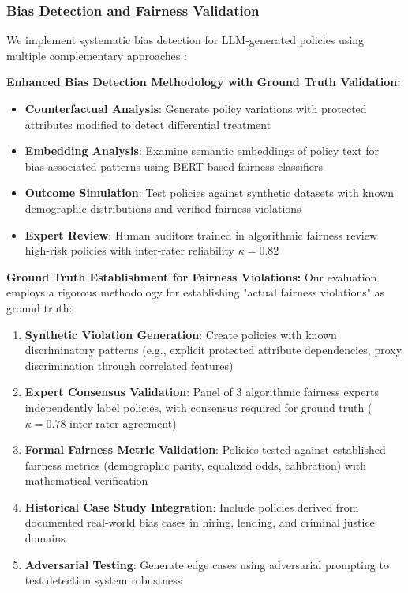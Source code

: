 \documentclass[sigconf,natbib]{acmart}
\begin{document}
\subsubsection{Bias Detection and Fairness Validation}
\label{subsubsec:bias_detection_evaluation}

We implement systematic bias detection for LLM-generated policies using multiple complementary approaches \cite{Mehrabi2021BiasAI}:

\textbf{Enhanced Bias Detection Methodology with Ground Truth Validation:}
\begin{itemize}
    \item \textbf{Counterfactual Analysis}: Generate policy variations with protected attributes modified to detect differential treatment
    \item \textbf{Embedding Analysis}: Examine semantic embeddings of policy text for bias-associated patterns using BERT-based fairness classifiers
    \item \textbf{Outcome Simulation}: Test policies against synthetic datasets with known demographic distributions and verified fairness violations
    \item \textbf{Expert Review}: Human auditors trained in algorithmic fairness review high-risk policies with inter-rater reliability $\kappa = 0.82$
\end{itemize}

\textbf{Ground Truth Establishment for Fairness Violations:}
Our evaluation employs a rigorous methodology for establishing "actual fairness violations" as ground truth:

\begin{enumerate}
    \item \textbf{Synthetic Violation Generation}: Create policies with known discriminatory patterns (e.g., explicit protected attribute dependencies, proxy discrimination through correlated features)
    \item \textbf{Expert Consensus Validation}: Panel of 3 algorithmic fairness experts independently label policies, with consensus required for ground truth ($\kappa = 0.78$ inter-rater agreement)
    \item \textbf{Formal Fairness Metric Validation}: Policies tested against established fairness metrics (demographic parity, equalized odds, calibration) with mathematical verification
    \item \textbf{Historical Case Study Integration}: Include policies derived from documented real-world bias cases in hiring, lending, and criminal justice domains
    \item \textbf{Adversarial Testing}: Generate edge cases using adversarial prompting to test detection system robustness
\end{enumerate}
\end{document}
